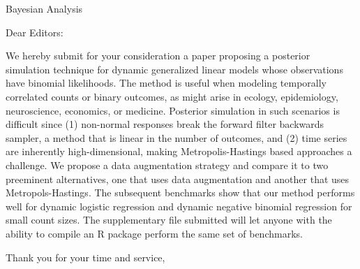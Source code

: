 \documentclass[12pt]{letter}
\newcounter{parnum}
\newcommand{\npoint}{%
  \noindent\refstepcounter{parnum}%
  \makebox[0.5in][c]{\textbf{\arabic{parnum}.}} %
  \marginnote{\small\ttfamily\the\inputlineno}}
\renewcommand{\npoint}{}
\begin{document}
 
\begin{letter}{Bayesian Analysis}
\opening{Dear Editors:}
 
\npoint We hereby submit for your consideration a paper proposing a posterior
simulation technique for dynamic generalized linear models whose observations
have binomial likelihoods.
%
\npoint The method is useful when modeling temporally correlated counts or
binary outcomes, as might arise in ecology, epidemiology, neuroscience,
economics, or medicine.
% 
\npoint Posterior simulation in such scenarios is difficult since (1) non-normal
responses break the forward filter backwards sampler, a method that is linear in
the number of outcomes, and (2) time series are inherently high-dimensional,
making Metropolis-Hastings based approaches a challenge.
% 
\npoint We propose a data augmentation strategy and compare it to two preeminent
alternatives, one that uses data augmentation and another that uses
Metropols-Hastings.
%
\npoint The subsequent benchmarks show that our method performs well for dynamic
logistic regression and dynamic negative binomial regression for small count
sizes.
% 
\npoint The supplementary file submitted will let anyone with the ability to
compile an R package perform the same set of benchmarks.

\closing{Thank you for your time and service,}
 
 
\end{letter}
 
\end{document}
